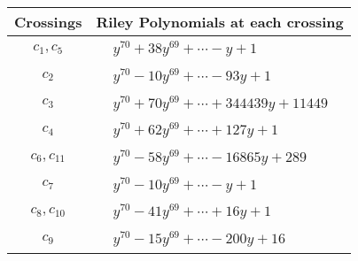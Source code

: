 \documentclass[1p]{elsarticle_modified}
\theoremstyle{definition}
\begin{document}
\begin{tabular}{m{50pt}|m{274pt}}
Crossings & \hspace{64pt}Riley Polynomials at each crossing \\
\hline $$\begin{aligned}c_{1},c_{5}\end{aligned}$$&$\begin{aligned}
&y^{70}+38 y^{69}+\cdots- y+1
\end{aligned}$\\
\hline $$\begin{aligned}c_{2}\end{aligned}$$&$\begin{aligned}
&y^{70}-10 y^{69}+\cdots-93 y+1
\end{aligned}$\\
\hline $$\begin{aligned}c_{3}\end{aligned}$$&$\begin{aligned}
&y^{70}+70 y^{69}+\cdots+344439 y+11449
\end{aligned}$\\
\hline $$\begin{aligned}c_{4}\end{aligned}$$&$\begin{aligned}
&y^{70}+62 y^{69}+\cdots+127 y+1
\end{aligned}$\\
\hline $$\begin{aligned}c_{6},c_{11}\end{aligned}$$&$\begin{aligned}
&y^{70}-58 y^{69}+\cdots-16865 y+289
\end{aligned}$\\
\hline $$\begin{aligned}c_{7}\end{aligned}$$&$\begin{aligned}
&y^{70}-10 y^{69}+\cdots- y+1
\end{aligned}$\\
\hline $$\begin{aligned}c_{8},c_{10}\end{aligned}$$&$\begin{aligned}
&y^{70}-41 y^{69}+\cdots+16 y+1
\end{aligned}$\\
\hline $$\begin{aligned}c_{9}\end{aligned}$$&$\begin{aligned}
&y^{70}-15 y^{69}+\cdots-200 y+16
\end{aligned}$\\
\hline
\end{tabular}\\~\\
\end{document}
